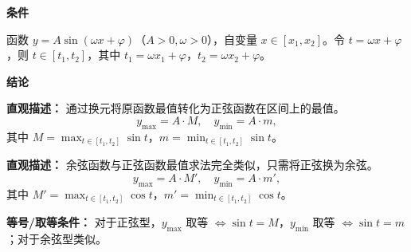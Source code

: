 \begin{statementbox}
	\textbf{\textcolor{CStatement}{条件}}
	\begin{description}[style=nextline, leftmargin=2.8em, labelsep=0.5em, itemsep=0.35em]
		\item[\textbf{\textcolor{CStatement}{条件 1（区间换元法）：}}] 函数 $y = A\sin(\omega x + \varphi)$（$A>0,\omega>0$），自变量 $x \in [x_1,x_2]$。令 $t = \omega x + \varphi$，则 $t \in [t_1,t_2]$，其中 $t_1 = \omega x_1 + \varphi$，$t_2 = \omega x_2 + \varphi$。
	\end{description}

	\textbf{\textcolor{CStatement}{结论}}
	\begin{description}[style=nextline, leftmargin=2.8em, labelsep=0.5em, itemsep=0.45em]
		\item[\textbf{\textcolor{CStatement}{结论一（最值公式）：}}]
			\textbf{\textcolor{CStatement}{直观描述：}}
			通过换元将原函数最值转化为正弦函数在区间上的最值。
			\[
				y_{\max}=A\cdot M,\quad y_{\min}=A\cdot m,
			\]
			其中 $M=\max_{t\in[t_1,t_2]}\sin t$，$m=\min_{t\in[t_1,t_2]}\sin t$。

		\item[\textbf{\textcolor{CStatement}{推广结论（余弦情形）：}}]
			\textbf{\textcolor{CStatement}{直观描述：}}
			余弦函数与正弦函数最值求法完全类似，只需将正弦换为余弦。
			\[
				y_{\max}=A\cdot M',\quad y_{\min}=A\cdot m',
			\]
			其中 $M'=\max_{t\in[t_1,t_2]}\cos t$，$m'=\min_{t\in[t_1,t_2]}\cos t$。
	\end{description}

	\textbf{\textcolor{CStatement}{等号/取等条件：}}
	对于正弦型，$y_{\max}$ 取等 $\Leftrightarrow \sin t = M$，$y_{\min}$ 取等 $\Leftrightarrow \sin t = m$；对于余弦型类似。
\end{statementbox}
